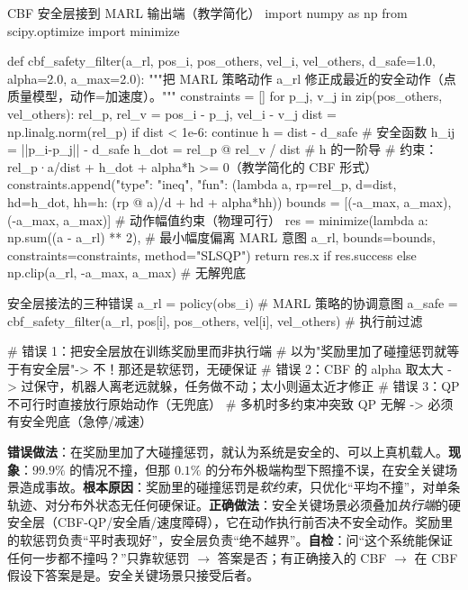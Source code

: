 \begin{codebox}[Python]{CBF 安全层接到 MARL 输出端（教学简化）}
import numpy as np
from scipy.optimize import minimize

def cbf_safety_filter(a_rl, pos_i, pos_others, vel_i, vel_others,
                      d_safe=1.0, alpha=2.0, a_max=2.0):
    """把 MARL 策略动作 a_rl 修正成最近的安全动作（点质量模型，动作=加速度）。"""
    constraints = []
    for p_j, v_j in zip(pos_others, vel_others):
        rel_p, rel_v = pos_i - p_j, vel_i - v_j
        dist = np.linalg.norm(rel_p)
        if dist < 1e-6:
            continue
        h = dist - d_safe                          # 安全函数 h_ij = ||p_i-p_j|| - d_safe
        h_dot = rel_p @ rel_v / dist               # h 的一阶导
        # 约束：rel_p·a/dist + h_dot + alpha*h >= 0（教学简化的 CBF 形式）
        constraints.append({"type": "ineq",
            "fun": (lambda a, rp=rel_p, d=dist, hd=h_dot, hh=h: (rp @ a)/d + hd + alpha*hh)})
    bounds = [(-a_max, a_max), (-a_max, a_max)]     # 动作幅值约束（物理可行）
    res = minimize(lambda a: np.sum((a - a_rl) ** 2),   # 最小幅度偏离 MARL 意图
                   a_rl, bounds=bounds, constraints=constraints, method="SLSQP")
    return res.x if res.success else np.clip(a_rl, -a_max, a_max)   # 无解兜底
\end{codebox}

\begin{codebox}[Python]{安全层接法的三种错误}
a_rl  = policy(obs_i)                              # MARL 策略的协调意图
a_safe = cbf_safety_filter(a_rl, pos[i], pos_others, vel[i], vel_others)  # 执行前过滤

# 错误 1：把安全层放在训练奖励里而非执行端
#   以为"奖励里加了碰撞惩罚就等于有安全层"-> 不！那还是软惩罚，无硬保证
# 错误 2：CBF 的 alpha 取太大 -> 过保守，机器人离老远就躲，任务做不动；太小则逼太近才修正
# 错误 3：QP 不可行时直接放行原始动作（无兜底）
#   多机时多约束冲突致 QP 无解 -> 必须有安全兜底（急停/减速）
\end{codebox}

\begin{pitfall}
\textbf{错误做法}：在奖励里加了大碰撞惩罚，就认为系统是安全的、可以上真机载人。\textbf{现象}：$99.9\%$ 的情况不撞，但那 $0.1\%$ 的分布外极端构型下照撞不误，在安全关键场景造成事故。\textbf{根本原因}：奖励里的碰撞惩罚是\emph{软约束}，只优化“平均不撞”，对单条轨迹、对分布外状态无任何硬保证。\textbf{正确做法}：安全关键场景必须叠加\emph{执行端}的硬安全层（CBF-QP/安全盾/速度障碍），它在动作执行前否决不安全动作。奖励里的软惩罚负责“平时表现好”，安全层负责“绝不越界”。\textbf{自检}：问“这个系统能保证任何一步都不撞吗？”只靠软惩罚 $\to$ 答案是否；有正确接入的 CBF $\to$ 在 CBF 假设下答案是是。安全关键场景只接受后者。
\end{pitfall}

